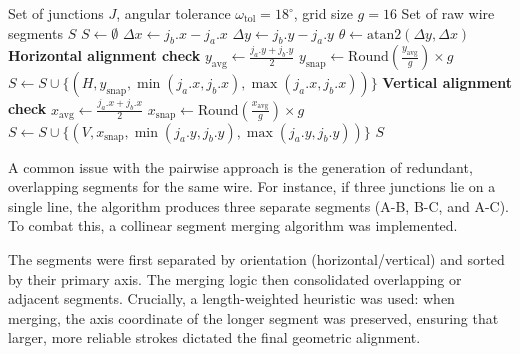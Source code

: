 \begin{algorithm}
\caption{Wire Classification and Alignment}
\label{algo:wire-classification-impl}
\begin{algorithmic}
\Require Set of junctions $J$, angular tolerance $\omega_{\text{tol}} = 18^\circ$, grid size $g = 16$
\Ensure Set of raw wire segments $S$
\State $S \leftarrow \emptyset$
    \State $\Delta x \leftarrow j_b.x - j_a.x$
    \State $\Delta y \leftarrow j_b.y - j_a.y$
    \State $\theta \leftarrow \text{atan2}(\Delta y, \Delta x)$
        \State \textbf{Horizontal alignment check}
        \State $y_{\text{avg}} \leftarrow \frac{j_a.y + j_b.y}{2}$
        \State $y_{\text{snap}} \leftarrow \text{Round}\left(\frac{y_{\text{avg}}}{g}\right) \times g$
        \State $S \leftarrow S \cup \{(H, y_{\text{snap}}, \min(j_a.x, j_b.x), \max(j_a.x, j_b.x))\}$
        \State \textbf{Vertical alignment check}
        \State $x_{\text{avg}} \leftarrow \frac{j_a.x + j_b.x}{2}$
        \State $x_{\text{snap}} \leftarrow \text{Round}\left(\frac{x_{\text{avg}}}{g}\right) \times g$
        \State $S \leftarrow S \cup \{(V, x_{\text{snap}}, \min(j_a.y, j_b.y), \max(j_a.y, j_b.y))\}$
    \EndIf
\EndFor
\State \Return $S$
\end{algorithmic}
\end{algorithm}

A common issue with the pairwise approach is the generation of redundant, overlapping segments for the same wire. For instance, if three junctions lie on a single line, the algorithm produces three separate segments (A-B, B-C, and A-C). To combat this, a collinear segment merging algorithm was implemented.

The segments were first separated by orientation (horizontal/vertical) and sorted by their primary axis. The merging logic then consolidated overlapping or adjacent segments. Crucially, a length-weighted heuristic was used: when merging, the axis coordinate of the longer segment was preserved, ensuring that larger, more reliable strokes dictated the final geometric alignment.

